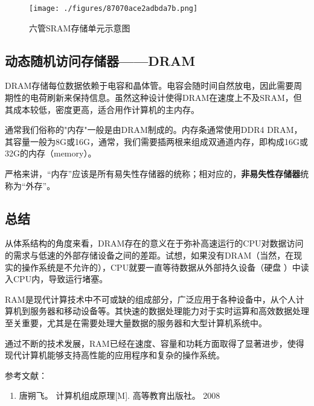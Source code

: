 \begin{figure}[ht]
\centering
\texttt{[image: ./figures/87070ace2adbda7b.png]}
\caption{六管SRAM存储单元示意图} \label{fig_RAM_3}
\end{figure}


\subsection{动态随机访问存储器——DRAM}

DRAM存储每位数据依赖于电容和晶体管。电容会随时间自然放电，因此需要周期性的电荷刷新来保持信息。虽然这种设计使得DRAM在速度上不及SRAM，但其成本较低，密度更高，适合用作计算机的主内存。

通常我们俗称的"内存"一般是由DRAM制成的。内存条通常使用DDR4 DRAM，其容量一般为8G或16G，通常，我们需要插两根来组成双通道内存，即构成16G或32G的内存（memory）。

严格来讲，“内存”应该是所有易失性存储器的统称；相对应的，\textbf{非易失性存储器}统称为“外存”。



\subsection{总结}
从体系结构的角度来看，DRAM存在的意义在于弥补高速运行的CPU对数据访问的需求与低速的外部存储设备之间的差距。试想，如果没有DRAM（当然，在现实的操作系统是不允许的），CPU就要一直等待数据从外部持久设备（硬盘 ）中读入CPU内，导致运行堵塞。

RAM是现代计算技术中不可或缺的组成部分，广泛应用于各种设备中，从个人计算机到服务器和移动设备等。其快速的数据处理能力对于实时运算和高效数据处理至关重要，尤其是在需要处理大量数据的服务器和大型计算机系统中。

通过不断的技术发展，RAM已经在速度、容量和功耗方面取得了显著进步，使得现代计算机能够支持高性能的应用程序和复杂的操作系统。


参考文献：
\begin{enumerate}
\item 唐朔飞。 计算机组成原理[M]. 高等教育出版社。 2008
\end{enumerate}
